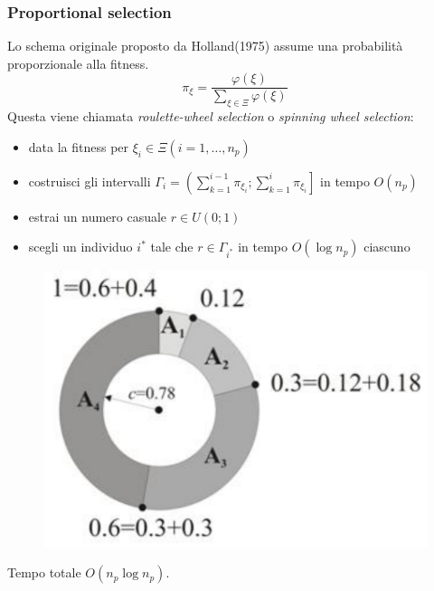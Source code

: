 \documentclass{article}
\begin{document}
\subsubsection{Proportional selection}
Lo schema originale proposto da Holland(1975) assume una probabilità proporzionale
alla fitness.
$$\pi_\xi=\frac{\varphi(\xi)}{\sum_{\xi\in\Xi}\varphi(\xi)}$$
Questa viene chiamata \textit{roulette-wheel selection} o \textit{spinning wheel selection}:
\begin{itemize}
    \item data la fitness per $\xi_i\in\Xi(i=1,\dots,n_p)$
    \item costruisci gli intervalli $\Gamma_i=\left(\sum_{k=1}^{i-1}\pi_{\xi_i};\sum_{k=1}^{i}\pi_{\xi_i}\right]$
    in tempo $O(n_p)$
    \item estrai un numero casuale $r\in U(0;1)$
    \item scegli un individuo $i^*$ tale che $r\in\Gamma_{i^*}$ in tempo $O(\log n_p)$ ciascuno
\end{itemize}
\begin{figure}[H]
    \centering
    \includegraphics[scale=0.5]{images/clocllog.png}
\end{figure}
Tempo totale $O(n_p\log n_p)$.
\end{document}
